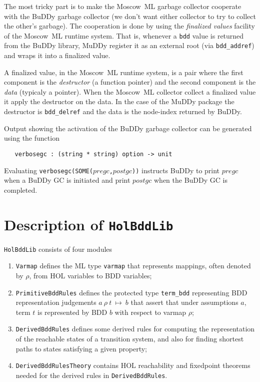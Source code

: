 \documentclass[12pt]{article}
\newcommand{\bnind}[1]{\index[MLbn]{#1}}
\renewcommand{\t}[1]{\mbox{\tt #1}}
\newcommand{\ml}[1]{{\tt #1}}
\newcommand{\termbdd}[4]{\mbox{$#1~#2~#3~\mapsto~#4$}}
\newcommand\termbddty{\texttt{term\_bdd}\xspace}
\newcommand{\mosml}{Moscow~ML\xspace}
\newcommand{\Buddy}{BuDDy\xspace}
\newcommand{\Muddy}{MuDDy\xspace}
\begin{document}
The most tricky part is to make the \mosml garbage collector cooperate
with the \Buddy garbage collector (we don't want either collector to
try to collect the other's garbage).  The cooperation is done by using
the \emph{finalized values} facility of the \mosml runtime system.
That is, whenever a \texttt{bdd} value is returned from the \Buddy
library, \Muddy register it as an external root (via
\verb+bdd_addref+) and wraps it into a finalized value.  

A finalized value, in the \mosml runtime system, is a pair where the
first component is the \emph{destructor} (a function pointer) and the
second component is the \emph{data} (typicaly a pointer).  When the
\mosml collector collect a finalized value it apply the destructor on
the data.  In the case of the \Muddy package the destructor is
\verb+bdd_delref+ and the data is the node-index returned by \Buddy.

Output showing the activation of the \Buddy garbage collector can be generated
using the function

\begin{verbatim}
   verbosegc : (string * string) option -> unit
\end{verbatim}\bnind{\ml{verbosegc}}

Evaluating \t{verbosegc(SOME($pregc$,$postgc$))} instructs BuDDy to print
$pregc$ when a BuDDy GC is initiated and print $postgc$ when the
\Buddy GC is completed.

\newpage

\part{Description of \t{HolBddLib}}\label{HolBddLib}

\t{HolBddLib} consists of four modules

\begin{enumerate}
\item \t{Varmap} defines the ML type \t{varmap} that represents mappings,
often denoted by $\rho$,
from HOL variables to BDD variables;

\item \t{PrimitiveBddRules} defines the protected type \termbddty
representing BDD representation judgements \termbdd{a}{\rho}{t}{b}
that assert that under assumptions $a$, term $t$ is represented by BDD $b$ with respect to
varmap $\rho$;

\item \t{DerivedBddRules} defines some derived rules for computing
the representation of the reachable states of a transition system,
and also for finding shortest paths to states  satisfying a given property;

\item \t{DerivedBddRulesTheory} contains HOL reachability and fixedpoint theorems needed
for the derived rules in  \t{DerivedBddRules}.


\end{enumerate}
\end{document}
